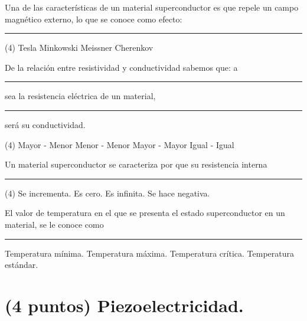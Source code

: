 \documentclass[12pt, letter]{exam}
\begin{document}
\begin{questions}
    \question Una de las características de un material superconductor es que repele un campo magnético externo, lo que se conoce como efecto: \rule{2cm}{0.1mm}
    \begin{tasks}(4)
        \task Tesla
        \task Minkowski
        \task Meissner
        \task Cherenkov
    \end{tasks}    
    \question De la relación entre resistividad y conductividad sabemos que: a \rule{2cm}{0.1mm} sea la resistencia eléctrica de un material, \rule{2cm}{0.1mm} será su conductividad.
    \begin{tasks}(4)
        \task Mayor - Menor
        \task Menor - Menor
        \task Mayor - Mayor
        \task Igual - Igual
    \end{tasks}
    \question Un material superconductor se caracteriza por que su resistencia interna \rule{2cm}{0.1mm}
    \begin{tasks}(4)
        \task Se incrementa.
        \task Es cero.
        \task Es infinita.
        \task Se hace negativa.
    \end{tasks}
    \question El valor de temperatura en el que se presenta el estado superconductor en un material, se le conoce como \rule{2cm}{0.1mm}
    \begin{multicols}{2}
    \begin{tasks}
        \task Temperatura mínima.
        \task Temperatura máxima.
        \task Temperatura crítica.
        \task Temperatura estándar.
    \end{tasks}
    \end{multicols}

    \newpage

    \section{(4 puntos) Piezoelectricidad.}


\end{questions}
\end{document}
